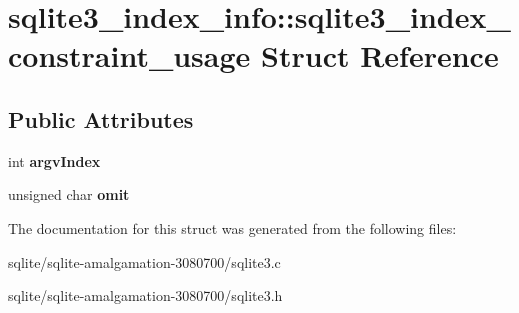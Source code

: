 \hypertarget{structsqlite3__index__info_1_1sqlite3__index__constraint__usage}{\section{sqlite3\+\_\+index\+\_\+info\+:\+:sqlite3\+\_\+index\+\_\+constraint\+\_\+usage Struct Reference}
\label{structsqlite3__index__info_1_1sqlite3__index__constraint__usage}
}
\subsection*{Public Attributes}
\begin{DoxyCompactItemize}
\item 
\hypertarget{structsqlite3__index__info_1_1sqlite3__index__constraint__usage_a2cbf680033c2937b3de226e091743a94}{int {\bfseries argv\+Index}}\label{structsqlite3__index__info_1_1sqlite3__index__constraint__usage_a2cbf680033c2937b3de226e091743a94}

\item 
\hypertarget{structsqlite3__index__info_1_1sqlite3__index__constraint__usage_ad07fa17d30e4fb3abe23ceaf84edf0ef}{unsigned char {\bfseries omit}}\label{structsqlite3__index__info_1_1sqlite3__index__constraint__usage_ad07fa17d30e4fb3abe23ceaf84edf0ef}

\end{DoxyCompactItemize}


The documentation for this struct was generated from the following files\+:\begin{DoxyCompactItemize}
\item 
sqlite/sqlite-\/amalgamation-\/3080700/sqlite3.\+c\item 
sqlite/sqlite-\/amalgamation-\/3080700/sqlite3.\+h\end{DoxyCompactItemize}

